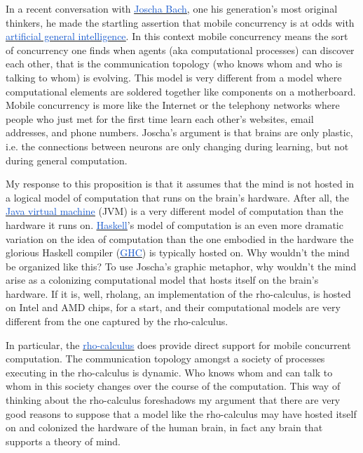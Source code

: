 \documentclass[runningheads]{llncs}
\begin{document}
In a recent conversation with \href{https://en.wikipedia.org/wiki/Joscha_Bach}{\uline{\textcolor[HTML]{1155CC}{Joscha Bach}}}, one his generation’s most original thinkers, he made the startling assertion that mobile concurrency is at odds with \href{https://en.wikipedia.org/wiki/Artificial_general_intelligence}{\uline{\textcolor[HTML]{1155CC}{artificial general intelligence}}}. In this context mobile concurrency means the sort of concurrency one finds when agents (aka computational processes) can discover each other, that is the communication topology (who knows whom and who is talking to whom) is evolving. This model is very different from a model where computational elements are soldered together like components on a motherboard. Mobile concurrency is more like the Internet or the telephony networks where people who just met for the first time learn each other’s websites, email addresses, and phone numbers. Joscha’s argument is that brains are only plastic, i.e. the connections between neurons are only changing during learning, but not during general computation.

\vspace{1\baselineskip}
My response to this proposition is that it assumes that the mind is not hosted in a logical model of computation that runs on the brain’s hardware. After all, the \href{https://en.wikipedia.org/wiki/Java_virtual_machine}{\uline{\textcolor[HTML]{1155CC}{Java virtual machine}}} (JVM) is a very different model of computation than the hardware it runs on. \href{https://en.wikipedia.org/wiki/Haskell}{\uline{\textcolor[HTML]{1155CC}{Haskell}}}’s model of computation is an even more dramatic variation on the idea of computation than the one embodied in the hardware the glorious Haskell compiler (\href{https://en.wikipedia.org/wiki/GHC}{\uline{\textcolor[HTML]{1155CC}{GHC}}}) is typically hosted on. Why wouldn’t the mind be organized like this? To use Joscha’s graphic metaphor, why wouldn’t the mind arise as a colonizing computational model that hosts itself on the brain’s hardware. If it is, well, rholang, an implementation of the rho-calculus, is hosted on Intel and AMD chips, for a start, and their computational models are very different from the one captured by the rho-calculus. 

\vspace{1\baselineskip}
In particular, the \href{https://www.sciencedirect.com/science/article/pii/S1571066105051893}{\uline{\textcolor[HTML]{1155CC}{rho-calculus}}} does provide direct support for mobile concurrent computation. The communication topology amongst a society of processes executing in the rho-calculus is dynamic. Who knows whom and can talk to whom in this society changes over the course of the computation. This way of thinking about the rho-calculus foreshadows my argument that there are very good reasons to suppose that a model like the rho-calculus may have hosted itself on and colonized the hardware of the human brain, in fact any brain that supports a theory of mind. 
\end{document}
